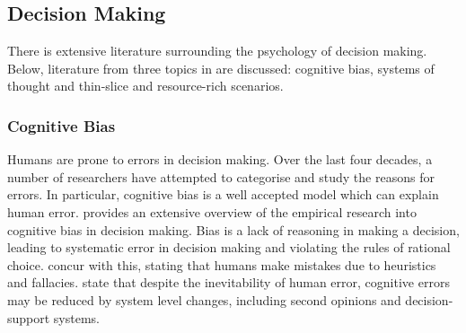 \documentclass[a4paper]{scrartcl}     %
\begin{document}



  \subsection{Decision Making}\label{sec:background:biases}

    There is extensive literature surrounding the psychology of decision making. Below, literature from three topics in are discussed: cognitive bias, systems of thought and thin-slice and resource-rich scenarios.

    \subsubsection{Cognitive Bias}\label{sec:background:biases:cog}


      Humans are prone to errors in decision making. Over the last four decades, a number of researchers have attempted to categorise and study the reasons for errors. In particular, cognitive bias is a well accepted model which can explain human error. \citet{Kahneman2012} provides an extensive overview of the empirical research into cognitive bias in decision making. Bias is a lack of reasoning in making a decision, leading to systematic error in decision making and violating the rules of rational choice. \citet{Thaler2012} concur with this, stating that humans make mistakes due to heuristics and fallacies. \citet{Graber2002} state that despite the inevitability of human error, cognitive errors may be reduced by system level changes, including second opinions and decision-support systems. %


\end{document}
